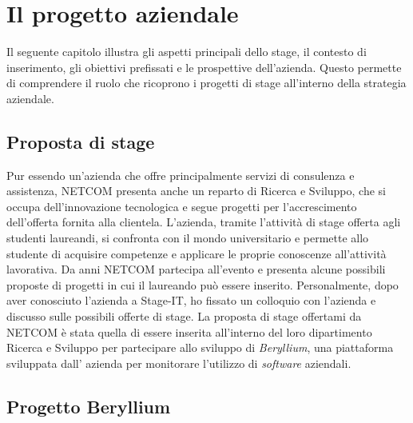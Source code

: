 


\chapter{Il progetto aziendale}
Il seguente capitolo illustra gli aspetti principali dello stage, il contesto di inserimento, gli obiettivi prefissati e le prospettive dell’azienda. Questo
permette di comprendere il ruolo che ricoprono i progetti di stage all’interno della strategia aziendale.
\section{Proposta di stage}
Pur essendo un’azienda che offre principalmente servizi di consulenza e assistenza, NETCOM presenta anche un reparto di Ricerca e Sviluppo, che si occupa dell'innovazione tecnologica e segue progetti per l’accrescimento dell’offerta fornita alla clientela.
L’azienda, tramite l'attività di stage offerta agli studenti laureandi, si  confronta con il mondo universitario e permette allo studente di acquisire competenze e applicare le proprie conoscenze all’attività lavorativa.
Da anni NETCOM partecipa all'evento  e presenta alcune possibili proposte di progetti in cui il laureando può essere inserito. 
Personalmente, dopo aver conosciuto l'azienda a Stage-IT, ho fissato un colloquio con l’azienda e discusso sulle possibili offerte di stage.
La proposta di stage offertami da NETCOM è stata quella di essere inserita all’interno del loro dipartimento Ricerca e Sviluppo per partecipare allo sviluppo di \emph{Beryllium}, una piattaforma sviluppata dall' azienda per monitorare l'utilizzo di \emph{software} aziendali.

\section{Progetto Beryllium}

